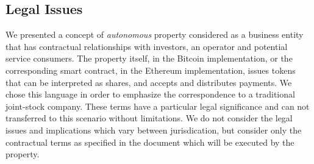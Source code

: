 \subsection{Legal Issues}
We presented a concept of \emph{autonomous} property considered as a business entity that has contractual relationships with investors, an operator and potential service consumers. The property itself, in the Bitcoin implementation, or the corresponding smart contract, in the Ethereum implementation, issues tokens that can be interpreted as shares, and accepts and distributes payments. We chose this language in order to emphasize the correspondence to a traditional joint-stock company. These terms have a particular legal significance and can not transferred to this scenario without limitations. We do not consider the legal issues and implications which vary between jurisdication, but consider only the contractual terms as specified in the document which will be executed by the property.